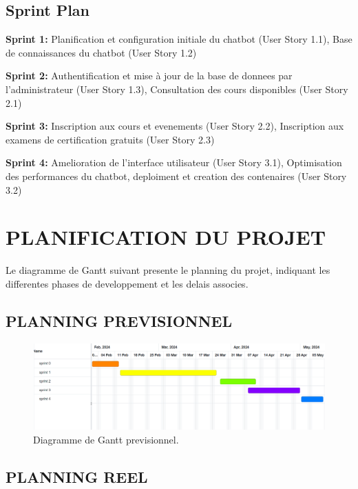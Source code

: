 \documentclass[a4paper, 11pt, openany]{report}
\begin{document}
\subsection{Sprint Plan}

\textbf{Sprint 1:} Planification et configuration initiale du chatbot (User Story 1.1), Base de connaissances du chatbot (User Story 1.2)

\textbf{Sprint 2:} Authentification et mise à jour de la base de donnees par l'administrateur (User Story 1.3), Consultation des cours disponibles (User Story 2.1)

\textbf{Sprint 3:} Inscription aux cours et evenements (User Story 2.2), Inscription aux examens de certification gratuits (User Story 2.3)

\textbf{Sprint 4:} Amelioration de l'interface utilisateur (User Story 3.1), Optimisation des performances du chatbot, deploiment et creation des contenaires (User Story 3.2)


\section{PLANIFICATION DU PROJET}
Le diagramme de Gantt suivant presente le planning du projet, indiquant les differentes phases de developpement et les delais associes.



\subsection{PLANNING PREVISIONNEL}

\begin{figure}[h!]
\centering
\includegraphics[width=\textwidth]{gant-prev.png}
\caption{Diagramme de Gantt previsionnel.}
\label{fig:prev-gantt}
\end{figure}


\clearpage





\subsection{PLANNING REEL}
\end{document}
